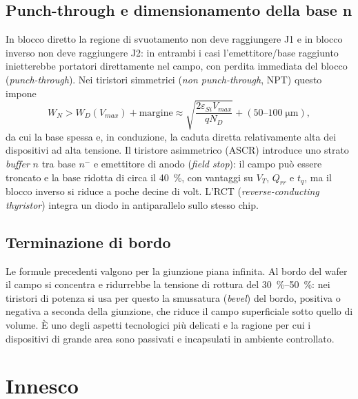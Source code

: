 \documentclass[11pt,a4paper]{article}
\newcommand{\tq}{\ensuremath{t_q}}
\newcommand{\en}[1]{\emph{#1}}   %
\begin{document}
\subsection{Punch-through e dimensionamento della base n}
In blocco diretto la regione di svuotamento non deve raggiungere J1 e in blocco inverso non deve raggiungere J2: in entrambi i casi l'emettitore/base raggiunto inietterebbe portatori direttamente nel campo, con perdita immediata del blocco (\en{punch-through}). Nei tiristori simmetrici (\en{non punch-through}, NPT) questo impone
\begin{equation}
  W_N > W_D(V_{max}) + \text{margine} \approx \sqrt{\frac{2\varepsilon_{Si} V_{max}}{qN_D}} + (\numrange{50}{100}\;\unit{\um}),
\end{equation}
da cui la base spessa e, in conduzione, la caduta diretta relativamente alta dei dispositivi ad alta tensione. Il tiristore asimmetrico (ASCR) introduce uno strato \en{buffer} $n$ tra base $n^-$ e emettitore di anodo (\en{field stop}): il campo può essere troncato e la base ridotta di circa il \qty{40}{\percent}, con vantaggi su $V_T$, $Q_{rr}$ e $\tq$, ma il blocco inverso si riduce a poche decine di volt. L'RCT (\en{reverse-conducting thyristor}) integra un diodo in antiparallelo sullo stesso chip.

\subsection{Terminazione di bordo}
Le formule precedenti valgono per la giunzione piana infinita. Al bordo del wafer il campo si concentra e ridurrebbe la tensione di rottura del \qtyrange{30}{50}{\percent}: nei tiristori di potenza si usa per questo la smussatura (\en{bevel}) del bordo, positiva o negativa a seconda della giunzione, che riduce il campo superficiale sotto quello di volume. È uno degli aspetti tecnologici più delicati e la ragione per cui i dispositivi di grande area sono passivati e incapsulati in ambiente controllato.

\section{Innesco}
\end{document}
